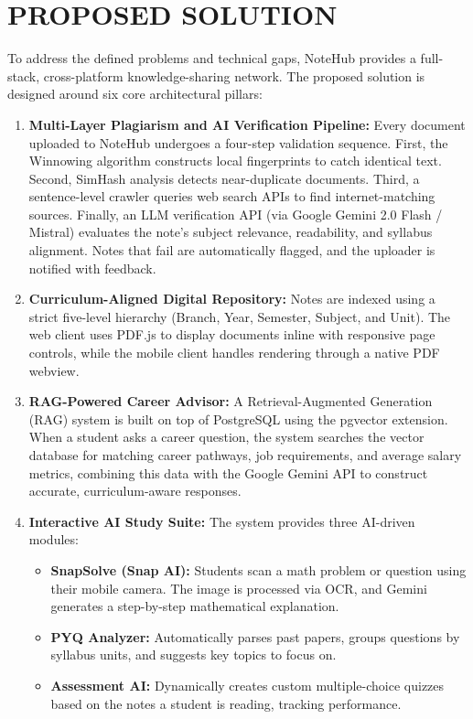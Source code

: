 \documentclass[12,Times new Roman,a4paper]{report}
\begin{document}
\section{PROPOSED SOLUTION}

To address the defined problems and technical gaps, NoteHub provides a full-stack, cross-platform knowledge-sharing network. The proposed solution is designed around six core architectural pillars:
\begin{enumerate}
    \item \textbf{Multi-Layer Plagiarism and AI Verification Pipeline:} Every document uploaded to NoteHub undergoes a four-step validation sequence. First, the Winnowing algorithm constructs local fingerprints to catch identical text. Second, SimHash analysis detects near-duplicate documents. Third, a sentence-level crawler queries web search APIs to find internet-matching sources. Finally, an LLM verification API (via Google Gemini 2.0 Flash / Mistral) evaluates the note's subject relevance, readability, and syllabus alignment. Notes that fail are automatically flagged, and the uploader is notified with feedback.
    \item \textbf{Curriculum-Aligned Digital Repository:} Notes are indexed using a strict five-level hierarchy (Branch, Year, Semester, Subject, and Unit). The web client uses PDF.js to display documents inline with responsive page controls, while the mobile client handles rendering through a native PDF webview.
    \item \textbf{RAG-Powered Career Advisor:} A Retrieval-Augmented Generation (RAG) system is built on top of PostgreSQL using the pgvector extension. When a student asks a career question, the system searches the vector database for matching career pathways, job requirements, and average salary metrics, combining this data with the Google Gemini API to construct accurate, curriculum-aware responses.
    \item \textbf{Interactive AI Study Suite:} The system provides three AI-driven modules:
    \begin{itemize}
        \item \textbf{SnapSolve (Snap AI):} Students scan a math problem or question using their mobile camera. The image is processed via OCR, and Gemini generates a step-by-step mathematical explanation.
        \item \textbf{PYQ Analyzer:} Automatically parses past papers, groups questions by syllabus units, and suggests key topics to focus on.
        \item \textbf{Assessment AI:} Dynamically creates custom multiple-choice quizzes based on the notes a student is reading, tracking performance.

\end{itemize}
\end{enumerate}
\end{document}
